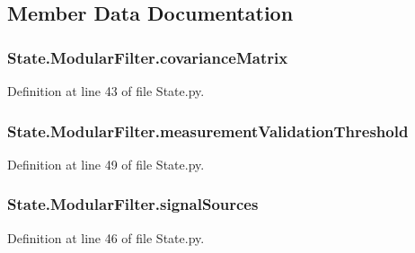 \subsection{Member Data Documentation}
\subsubsection[{\texorpdfstring{covariance\+Matrix}{covarianceMatrix}}]{\setlength{\rightskip}{0pt plus 5cm}State.\+Modular\+Filter.\+covariance\+Matrix}\hypertarget{classState_1_1ModularFilter_a1981026f261047a45a6a7d89bbf1b7de}{}\label{classState_1_1ModularFilter_a1981026f261047a45a6a7d89bbf1b7de}


Definition at line 43 of file State.\+py.

\subsubsection[{\texorpdfstring{measurement\+Validation\+Threshold}{measurementValidationThreshold}}]{\setlength{\rightskip}{0pt plus 5cm}State.\+Modular\+Filter.\+measurement\+Validation\+Threshold}\hypertarget{classState_1_1ModularFilter_adf637093941f85a6ca14a122f232657a}{}\label{classState_1_1ModularFilter_adf637093941f85a6ca14a122f232657a}


Definition at line 49 of file State.\+py.

\subsubsection[{\texorpdfstring{signal\+Sources}{signalSources}}]{\setlength{\rightskip}{0pt plus 5cm}State.\+Modular\+Filter.\+signal\+Sources}\hypertarget{classState_1_1ModularFilter_a23afc4a8d6b45e56b68ab99d8b9d9efa}{}\label{classState_1_1ModularFilter_a23afc4a8d6b45e56b68ab99d8b9d9efa}


Definition at line 46 of file State.\+py.

